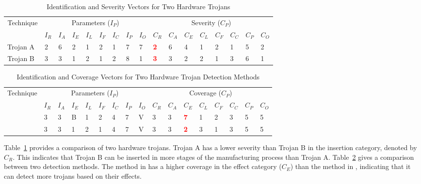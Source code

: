 \begin{table}[h]
	\centering
	\caption{Identification and Severity Vectors for Two Hardware Trojans}
	\label{tbl:severityTable}
	\renewcommand{\arraystretch}{1.2}
	\begin{tabular}{|c|p{3mm}p{3mm}p{3mm}p{3mm}p{3mm}p{3mm}p{3mm}p{3.5mm}|p{3mm}p{3mm}p{3mm}p{3mm}p{3mm}p{3mm}p{3mm}p{3.5mm}|}
		\hline
		Technique & \multicolumn{8}{c|}{Parameters ($I_P$)} & \multicolumn{8}{c|}{Severity ($C_P$)} \\ \cline{2-17}
		& $I_R$ & $I_A$ & $I_E$ & $I_L$ & $I_F$ & $I_C$ & $I_P$ & $I_O$ & $C_R$ & $C_A$ & $C_E$ & $C_L$ & $C_F$ & $C_C$ & $C_P$ & $C_O$ \\ \hline
		Trojan A~\cite{samerAttribute} & 2 & 6 & 2 & 1 & 2 & 1 & 7 & 7 & \textbf{\textcolor{red}{2}} & 6 & 4 & 1 & 2 & 1 & 5 & 2 \\ \hline
		Trojan B~\cite{samerAttribute} & 3 & 3 & 1 & 2 & 1 & 2 & 8 & 1 & \textbf{\textcolor{red}{3}} & 3 & 2 & 2 & 1 & 3 & 6 & 1 \\ \hline
	\end{tabular}
\end{table}
\begin{table}[h]
	\centering
	\caption{Identification and Coverage Vectors for Two Hardware Trojan Detection Methods}
	\label{tbl:detectionTable}
	\renewcommand{\arraystretch}{1.2}
	\begin{tabular}{|c|p{3mm}p{3mm}p{3mm}p{3mm}p{3mm}p{3mm}p{3mm}p{3.5mm}|p{3mm}p{3mm}p{3mm}p{3mm}p{3mm}p{3mm}p{3mm}p{3.5mm}|}
		\hline
		Technique & \multicolumn{8}{c|}{Parameters ($I_P$)} & \multicolumn{8}{c|}{Coverage ($C_P$)} \\ \cline{2-17}
		& $I_R$ & $I_A$ & $I_E$ & $I_L$ & $I_F$ & $I_C$ & $I_P$ & $I_O$ & $C_R$ & $C_A$ & $C_E$ & $C_L$ & $C_F$ & $C_C$ & $C_P$ & $C_O$ \\ \hline
		\cite{method1} & 3 & 3 & B & 1 & 2 & 4 & 7 & V  & 3 & 3 & \textbf{\textcolor{red}{7}} & 1 & 2 & 3 & 5 & 5 \\ \hline
		\cite{method2} & 3 & 3 & 1 & 2 & 1 & 4 & 7 & V  & 3 & 3 & \textbf{\textcolor{red}{2}} & 3 & 1 & 3 & 5 & 5 \\ \hline
	\end{tabular}
\end{table}

Table~\ref{tbl:severityTable} provides a comparison of two hardware trojans.
Trojan A has a lower severity than Trojan B in the insertion category, denoted by $C_R$.
This indicates that Trojan B can be inserted in more stages of the manufacturing process than Trojan A.
Table~\ref{tbl:detectionTable} gives a comparison between two detection methods.
The method in \cite{method1} has a higher coverage in the effect category ($C_E$) than the method in \cite{method2},
indicating that it can detect more trojans based on their effects.

